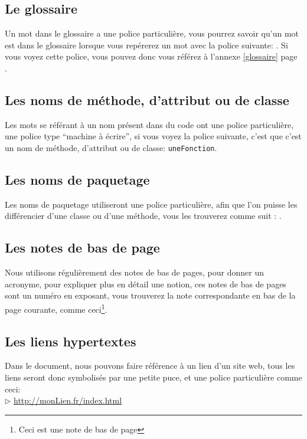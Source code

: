 \subsection*{Le glossaire}
Un mot dans le glossaire a une police particulière, vous pourrez savoir qu'un mot est dans le glossaire lorsque vous repérerez un mot avec la police suivante: 
. Si vous voyez cette police, vous pouvez donc vous référez à l'annexe \ref{glossaire} page \pageref{glossaire}.
\subsection*{Les noms de méthode, d'attribut ou de classe}
Les mots se référant à un nom présent dans du code ont une police particulière, une police type ``machine à écrire'', si vous voyez la police suivante, c'est que c'est un nom 
de méthode, d'attribut ou de classe: \texttt{uneFonction}.
\subsection*{Les noms de paquetage}
Les noms de paquetage utiliseront une police particulière, afin que l'on puisse les différencier d'une classe ou d'une méthode, vous les trouverez 
comme suit : .
\subsection*{Les notes de bas de page}
Nous utilisons régulièrement des notes de bas de pages, pour donner un acronyme, pour expliquer plus en détail une notion, ces notes de bas de pages sont un numéro
en exposant, vous trouverez la note correspondante en bas de la page courante, comme ceci\footnote{Ceci est une note de bas de page}.
\subsection*{Les liens hypertextes}
Dans le document, nous pouvons faire référence à un lien d'un site web, tous les liens seront donc symbolisés par une petite puce, et une police particulière comme ceci:\\
	$\rhd$ \url{http://monLien.fr/index.html}\\

